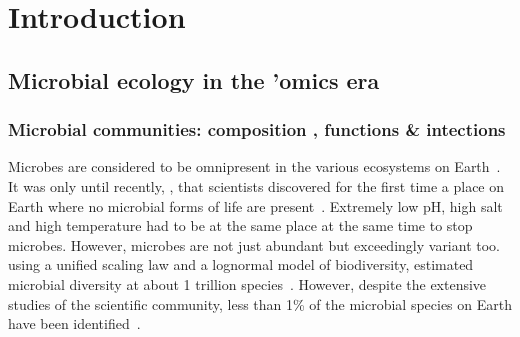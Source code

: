 \chapter{Introduction}
\label{cha:intro}


\section{Microbial ecology in the 'omics era}

   \subsection{Microbial communities: composition 
   , functions 
   \& intections 
   }


      \fi
      Microbes are considered to be omnipresent in the 
      various ecosystems on Earth~\citep{falkowski2008microbial}.
      It was only until recently, \citeyear{belilla2019hyperdiverse}, that scientists discovered for the first time 
      a place on Earth where no microbial forms of life are present~\cite{belilla2019hyperdiverse}.
      Extremely low pH, high salt and high temperature had to be 
      at the same place at the same time to stop microbes.
      However, microbes are not just abundant but 
      exceedingly variant too.
      \citeauthor{locey2016scaling} using a unified scaling law
      and a lognormal model of biodiversity, 
      estimated microbial diversity at about 1 trillion species~\cite{locey2016scaling}.
      However, despite the extensive studies of the scientific community, 
      less than 1\% of the microbial species on Earth have been identified~\cite{isme}.
      
